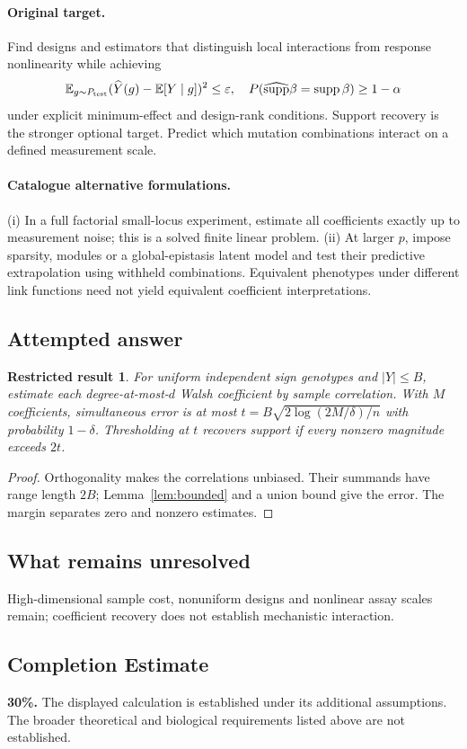 \documentclass[11pt]{article}
\newcommand{\E}{\mathbb E}
\providecommand{\E}{\mathbb E}
\newtheorem{attemptresult}{Restricted result}[section]
\begin{document}
\paragraph{Original target.}
Find designs and estimators that distinguish local interactions from response nonlinearity while achieving
\[
\E_{g\sim P_{\rm test}}(\widehat Y(g)-\E[Y\mid g])^2\leq\varepsilon,
\quad P(\widehat{\operatorname{supp}}\beta=\operatorname{supp}\beta)\geq1-\alpha
\]
under explicit minimum-effect and design-rank conditions. Support recovery is the stronger optional target. Predict which mutation combinations interact on a defined measurement scale.
\paragraph{Catalogue alternative formulations.}
(i) In a full factorial small-locus experiment, estimate all coefficients exactly up to measurement noise; this is a solved finite linear problem. (ii) At larger $p$, impose sparsity, modules or a global-epistasis latent model and test their predictive extrapolation using withheld combinations. Equivalent phenotypes under different link functions need not yield equivalent coefficient interpretations.
\subsection{Attempted answer}
\begin{attemptresult}
For uniform independent sign genotypes and $|Y|\leq B$, estimate each degree-at-most-$d$ Walsh coefficient by sample correlation. With $M$ coefficients, simultaneous error is at most $t=B\sqrt{2\log(2M/\delta)/n}$ with probability $1-\delta$. Thresholding at $t$ recovers support if every nonzero magnitude exceeds $2t$.
\end{attemptresult}
\begin{proof}
Orthogonality makes the correlations unbiased. Their summands have range length $2B$; Lemma~\ref{lem:bounded} and a union bound give the error. The margin separates zero and nonzero estimates.
\end{proof}
\subsection{What remains unresolved}
High-dimensional sample cost, nonuniform designs and nonlinear assay scales remain; coefficient recovery does not establish mechanistic interaction.
\subsection{Completion Estimate}
\textbf{30\%.} The displayed calculation is established under its additional assumptions. The broader theoretical and biological requirements listed above are not established.
\end{document}
